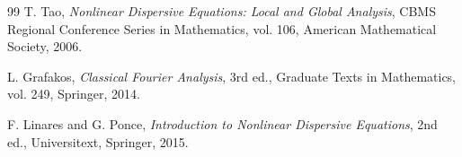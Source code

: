 \documentclass[preprint,12pt]{elsarticle}
\numberwithin{equation}{section}
\theoremstyle{remark}
\begin{document}
\begin{thebibliography}{99}
T. Tao,
\newblock \emph{Nonlinear Dispersive Equations: Local and Global Analysis},
\newblock CBMS Regional Conference Series in Mathematics, vol. 106, American Mathematical Society, 2006.

L. Grafakos,
\newblock \emph{Classical Fourier Analysis}, 3rd ed.,
\newblock Graduate Texts in Mathematics, vol. 249, Springer, 2014.

F. Linares and G. Ponce,
\newblock \emph{Introduction to Nonlinear Dispersive Equations}, 2nd ed.,
\newblock Universitext, Springer, 2015.

\end{thebibliography}
\end{document}
